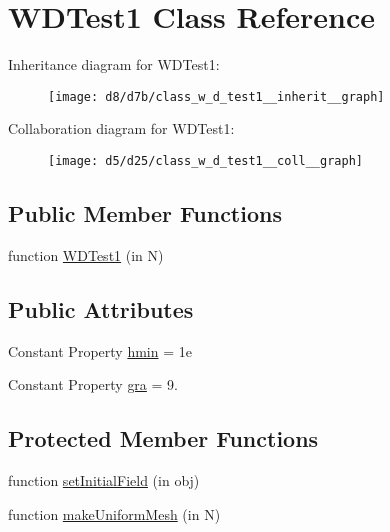 \hypertarget{class_w_d_test1}{}\section{W\+D\+Test1 Class Reference}
\label{class_w_d_test1}


Inheritance diagram for W\+D\+Test1\+:
\nopagebreak
\begin{figure}[H]
\begin{center}
\leavevmode
\texttt{[image: d8/d7b/class\_w\_d\_test1\_\_inherit\_\_graph]}
\end{center}
\end{figure}


Collaboration diagram for W\+D\+Test1\+:
\nopagebreak
\begin{figure}[H]
\begin{center}
\leavevmode
\texttt{[image: d5/d25/class\_w\_d\_test1\_\_coll\_\_graph]}
\end{center}
\end{figure}
\subsection*{Public Member Functions}
\begin{DoxyCompactItemize}
\item 
function \hyperlink{class_w_d_test1_a607de7baee27ee4f5b1a1067ba49a2a8}{W\+D\+Test1} (in N)
\end{DoxyCompactItemize}
\subsection*{Public Attributes}
\begin{DoxyCompactItemize}
\item 
Constant Property \hyperlink{class_w_d_test1_a82aa42df16be04a915c42b21e8a5233a}{hmin} = 1e
\item 
Constant Property \hyperlink{class_w_d_test1_a96428c6adab61537167ef1c857674b5c}{gra} = 9.
\end{DoxyCompactItemize}
\subsection*{Protected Member Functions}
\begin{DoxyCompactItemize}
\item 
function \hyperlink{class_w_d_test1_ab2de330542649cc5cb585c12ae0de1fe}{set\+Initial\+Field} (in obj)
\item 
function \hyperlink{class_w_d_test1_a821d35c2d428fa06cfa481e3a293ae2e}{make\+Uniform\+Mesh} (in N)
\end{DoxyCompactItemize}


